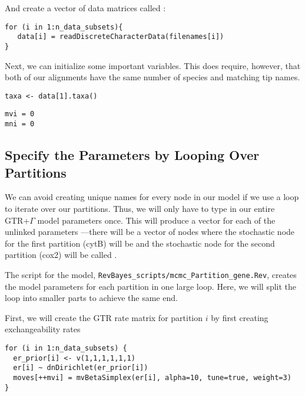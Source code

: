 And create a vector of data matrices called :
{\tt \begin{snugshade*}
\begin{lstlisting}
for (i in 1:n_data_subsets){
   data[i] = readDiscreteCharacterData(filenames[i])
}
\end{lstlisting}
\end{snugshade*}}

Next, we can initialize some important variables. 
This does require, however, that both of our alignments have the same number of species and matching tip names.
{\tt \begin{snugshade*}
\begin{lstlisting}
taxa <- data[1].taxa()
\end{lstlisting}
\end{snugshade*}}

{\tt \begin{snugshade*}
\begin{lstlisting}
mvi = 0 
mni = 0
\end{lstlisting}
\end{snugshade*}}


\subsection{Specify the Parameters by Looping Over Partitions}

We can avoid creating unique names for every node in our model if we use a  loop to iterate over our partitions. Thus, we will only have to type in our entire GTR+$\Gamma$ model parameters once. 
This will produce a vector for each of the unlinked parameters ---\EG there will be a vector of  nodes where the stochastic node for the first partition (cytB) will be  and the stochastic node for the second partition (cox2) will be called .

The script for the model, {\tt RevBayes\_scripts/mcmc\_Partition\_gene.Rev}, creates the model parameters for each partition in one large loop.
Here, we will split the loop into smaller parts to achieve the same end.

First, we will create the GTR rate matrix for partition $i$ by first creating exchangeability rates
{\tt \small \begin{snugshade*}
\begin{lstlisting}
for (i in 1:n_data_subsets) {
  er_prior[i] <- v(1,1,1,1,1,1)
  er[i] ~ dnDirichlet(er_prior[i])
  moves[++mvi] = mvBetaSimplex(er[i], alpha=10, tune=true, weight=3) 
}
\end{lstlisting}
\end{snugshade*}}

